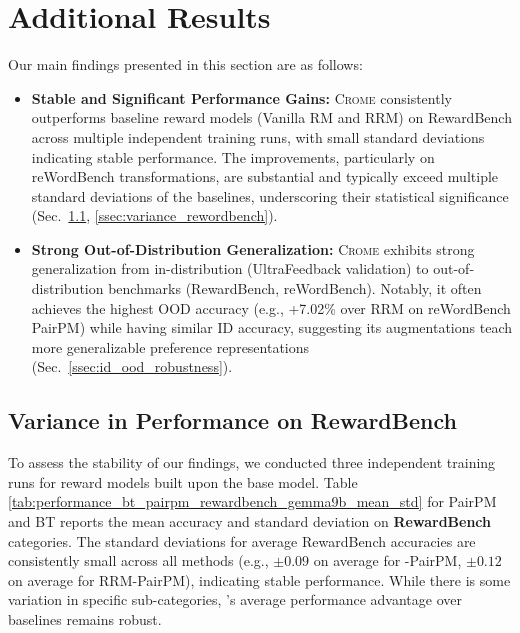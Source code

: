 \clearpage
\section{Additional Results}
\label{sec:additional_results}

Our main findings presented in this section are as follows:
\vspace{0.05in}
\begin{takeawaybox}
\begin{itemize}[leftmargin=1.5em, itemsep=1pt, topsep=2pt]
    \item \textbf{Stable and Significant Performance Gains:} \textsc{Crome} consistently outperforms baseline reward models (Vanilla RM and RRM) on RewardBench across multiple independent training runs, with small standard deviations indicating stable performance. The improvements, particularly on reWordBench transformations, are substantial and typically exceed multiple standard deviations of the baselines, underscoring their statistical significance (Sec.~\ref{ssec:variance_rewardbench}, \ref{ssec:variance_rewordbench}).
    \item \textbf{Strong Out-of-Distribution Generalization:} \textsc{Crome} exhibits strong generalization from in-distribution (UltraFeedback validation) to out-of-distribution benchmarks (RewardBench, reWordBench). Notably, it often achieves the highest OOD accuracy (e.g., +7.02\% over RRM on reWordBench PairPM) while having similar ID accuracy, suggesting its augmentations teach more generalizable preference representations (Sec.~\ref{ssec:id_ood_robustness}).
\end{itemize}
\end{takeawaybox}


\subsection{Variance in Performance on RewardBench}
\label{ssec:variance_rewardbench}

To assess the stability of our findings, we conducted three independent training runs for reward models built upon the  base model. Table \ref{tab:performance_bt_pairpm_rewardbench_gemma9b_mean_std} 
for PairPM and BT reports the mean accuracy and standard deviation on \textbf{RewardBench} categories. The standard deviations for average RewardBench accuracies are consistently small across all methods (e.g., $\pm 0.09$ on average for \carma{}-PairPM, $\pm 0.12$ on average for RRM-PairPM), indicating stable performance. While there is some variation in specific sub-categories, \carma{}'s average performance advantage over baselines remains robust.

